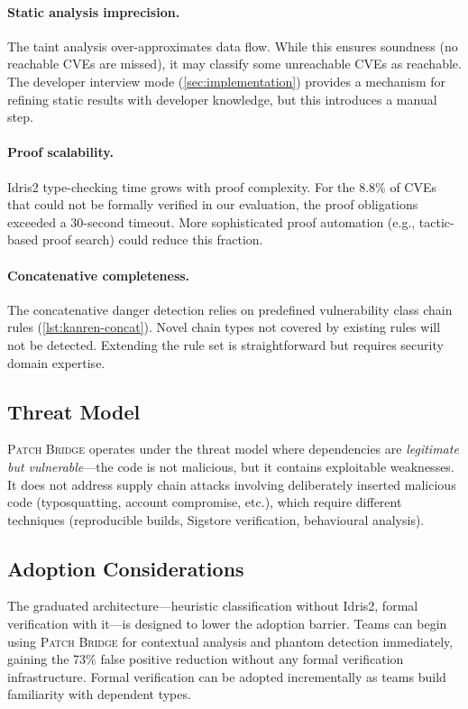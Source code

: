 \documentclass[11pt,twocolumn]{article}
\begin{document}
\paragraph{Static analysis imprecision.} The taint analysis
over-approximates data flow. While this ensures soundness (no
reachable CVEs are missed), it may classify some unreachable CVEs as
reachable. The developer interview mode (\cref{sec:implementation})
provides a mechanism for refining static results with developer
knowledge, but this introduces a manual step.

\paragraph{Proof scalability.} Idris2 type-checking time grows with
proof complexity. For the 8.8\% of CVEs that could not be formally
verified in our evaluation, the proof obligations exceeded a 30-second
timeout. More sophisticated proof automation (e.g., tactic-based
proof search) could reduce this fraction.

\paragraph{Concatenative completeness.} The concatenative danger
detection relies on predefined vulnerability class chain rules
(\cref{lst:kanren-concat}). Novel chain types not covered by existing
rules will not be detected. Extending the rule set is straightforward
but requires security domain expertise.

\subsection{Threat Model}

\textsc{Patch Bridge} operates under the threat model where
dependencies are \emph{legitimate but vulnerable}---the code is not
malicious, but it contains exploitable weaknesses. It does not address
supply chain attacks involving deliberately inserted malicious code
(typosquatting, account compromise, etc.), which require different
techniques (reproducible builds, Sigstore verification, behavioural
analysis).

\subsection{Adoption Considerations}

The graduated architecture---heuristic classification without Idris2,
formal verification with it---is designed to lower the adoption barrier.
Teams can begin using \textsc{Patch Bridge} for contextual analysis and
phantom detection immediately, gaining the 73\% false positive reduction
without any formal verification infrastructure. Formal verification can
be adopted incrementally as teams build familiarity with dependent types.
\end{document}
